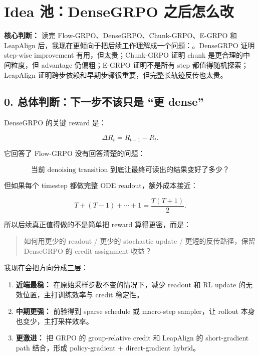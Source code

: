 
\section{Idea 池：DenseGRPO 之后怎么改}

\begin{conceptbox}
\textbf{核心判断：} 读完 Flow-GRPO、DenseGRPO、Chunk-GRPO、E-GRPO 和 LeapAlign 后，我现在更倾向于把后续工作理解成一个问题：。DenseGRPO 证明 step-wise improvement 有用，但太贵；Chunk-GRPO 证明 chunk 是更合理的中间粒度，但 advantage 仍偏粗；E-GRPO 证明不是所有 step 都值得随机探索；LeapAlign 证明跨步依赖和早期步骤很重要，但完整长轨迹反传也太贵。
\end{conceptbox}

\subsection{0. 总体判断：下一步不该只是 ``更 dense''}

DenseGRPO 的关键 reward 是：

\[
\Delta R_t = R_{t-1} - R_t.
\]

它回答了 Flow-GRPO 没有回答清楚的问题：

\[
\text{当前 denoising transition 到底让最终可读出的结果变好了多少？}
\]

但如果每个 timestep 都做完整 ODE readout，额外成本接近：

\[
T + (T-1) + \cdots + 1 = \frac{T(T+1)}{2}.
\]

所以后续真正值得做的不是简单把 reward 算得更密，而是：

\begin{quote}
如何用更少的 readout / 更少的 stochastic update / 更短的反传路径，保留 DenseGRPO 的 credit assignment 收益？
\end{quote}

我现在会把方向分成三层：

\begin{enumerate}[leftmargin=1.5em]
  \item \textbf{近端最稳：} 在原始采样步数不变的情况下，减少 readout 和 RL update 的无效位置，主打训练效率与 credit 稳定性。
  \item \textbf{中期更强：} 前验得到 sparse schedule 或 macro-step sampler，让 rollout 本身也变少，主打采样效率。
  \item \textbf{更激进：} 把 GRPO 的 group-relative credit 和 LeapAlign 的 short-gradient path 结合，形成 policy-gradient + direct-gradient hybrid。
\end{enumerate}


